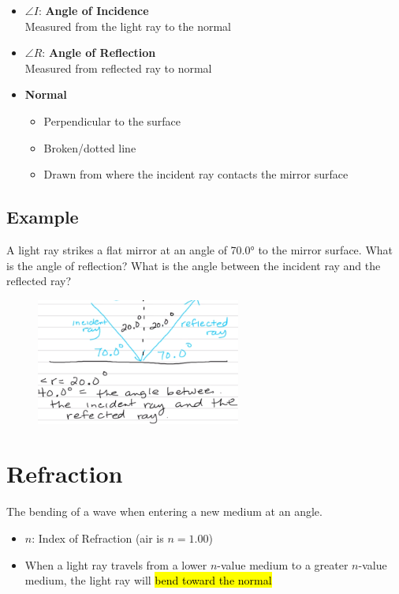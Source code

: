 \documentclass[a4paper,12pt]{article}
\begin{document}
\begin{itemize}
    \item{$\angle{I}$: \textbf{Angle of Incidence} \\Measured from the light ray to the normal}
    \item{$\angle{R}$: \textbf{Angle of Reflection} \\Measured from reflected ray to normal}
    \item{
            \textbf{Normal}
            \begin{itemize}
                \item{Perpendicular to the surface}
                \item{Broken/dotted line}
                \item{Drawn from where the incident ray contacts the mirror surface}
            \end{itemize}
        }
\end{itemize}

\subsection{Example}
A light ray strikes a flat mirror at an angle of \ang{70.0} to the mirror surface. What is the angle of reflection? What is the angle between the incident ray and the reflected ray?
\begin{figure}[H]
    \centering
    \includegraphics[width=0.6\textwidth]{ex-reflect}
\end{figure}

\section{Refraction}
The bending of a wave when entering a new medium at an angle.

\begin{itemize}
    \item{$n$: Index of Refraction (air is $n = \num{1.00}$)}
    \item{When a light ray travels from a lower $n$-value medium to a greater $n$-value medium, the light ray will \hl{bend toward the normal}}
\end{itemize}
\end{document}

